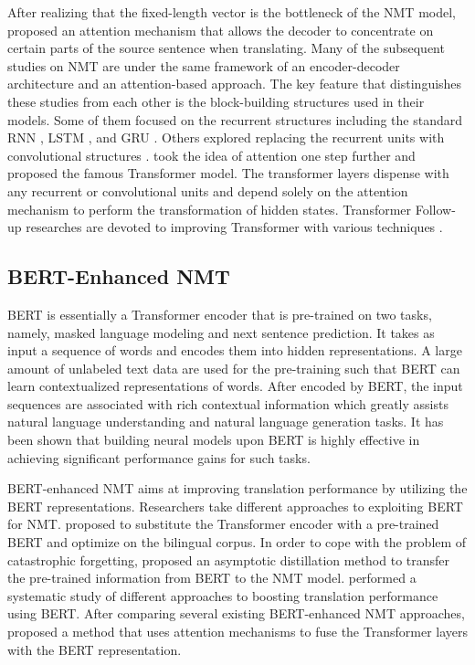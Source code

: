 \documentclass[review]{elsarticle}
\begin{document}
After realizing that the fixed-length vector is the bottleneck of the NMT model, \citet{Bahdanau14} proposed an attention mechanism that allows the decoder to concentrate on certain parts of the source sentence when translating. 
Many of the subsequent studies on NMT are under the same framework of an encoder-decoder architecture and an attention-based approach. 
The key feature that distinguishes these studies from each other is the block-building structures used in their models. Some of them focused on the recurrent structures including the standard RNN \cite{Bahdanau14}, LSTM \cite{Wu16, Luong15b}, and GRU \cite{Jean15}. Others explored replacing the recurrent units with convolutional structures \cite{Gehring17, Wu19}. 
\citet{Vaswani17} took the idea of attention one step further and proposed the famous Transformer model. The transformer layers dispense with any recurrent or convolutional units and depend solely on the attention mechanism to perform the transformation of hidden states. Transformer Follow-up researches are devoted to improving Transformer with various techniques \cite{Gu19, Fonollosa19, Indurthi19}.


\subsection{BERT-Enhanced NMT}
BERT \cite{Delvin19} is essentially a Transformer encoder that is pre-trained on two tasks, namely, masked language modeling and next sentence prediction. It takes as input a sequence of words and encodes them into hidden representations.
A large amount of unlabeled text data are used for the pre-training such that BERT can learn contextualized representations of words. 
After encoded by BERT, the input sequences are associated with rich contextual information which greatly assists natural language understanding and natural language generation tasks. It has been shown that building neural models upon BERT is highly effective in achieving significant performance gains for such tasks.

BERT-enhanced NMT aims at improving translation performance by utilizing the BERT representations. Researchers take different approaches to exploiting BERT for NMT. 
\citet{Imamura19} proposed to substitute the Transformer encoder with a pre-trained BERT and optimize on the bilingual corpus. 
In order to cope with the problem of catastrophic forgetting, \citet{Yang20} proposed an asymptotic distillation method to transfer the pre-trained information from BERT to the NMT model.
\citet{Clinchant19} performed a systematic study of different approaches to boosting translation performance using BERT.
After comparing several existing BERT-enhanced NMT approaches, \citet{Zhu20} proposed a method that uses attention mechanisms to fuse the Transformer layers with the BERT representation.
\end{document}
